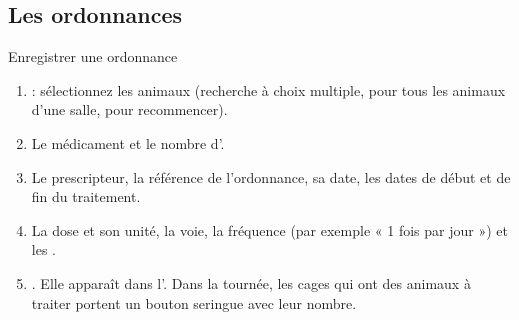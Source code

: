 \documentclass[11pt,a4paper]{article}
\begin{document}
\subsection{Les ordonnances}
\begin{procedure}{Enregistrer une ordonnance}
\begin{enumerate}
  \item {} : sélectionnez les animaux (recherche à choix
    multiple,  pour tous les animaux d'une salle,
     pour recommencer).
  \item Le médicament et le nombre d'.
  \item Le prescripteur, la référence de l'ordonnance, sa date, les dates de
    début et de fin du traitement.
  \item La dose et son unité, la voie, la fréquence (par exemple « 1 fois
    par jour ») et les .
  \item {}. Elle apparaît dans
    l'. Dans la tournée, les cages qui ont des animaux à
    traiter portent un bouton seringue avec leur nombre.
\end{enumerate}
\end{procedure}
\end{document}
